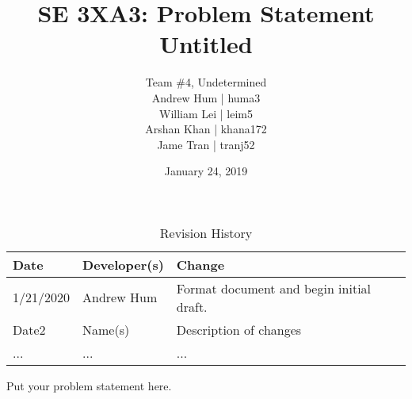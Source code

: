 \documentclass{article}
\title{SE 3XA3: Problem Statement\\Untitled}
\author{Team \#4, Undetermined
		\\ Andrew Hum | huma3
		\\ William Lei | leim5
		\\ Arshan Khan | khana172
		\\ Jame Tran | tranj52
}
\date{January 24, 2019}
\begin{document}
\begin{table}[hp]
\caption{Revision History} \label{TblRevisionHistory}
\begin{tabularx}{\textwidth}{llX}
\toprule
\textbf{Date} & \textbf{Developer(s)} & \textbf{Change}\\
\midrule
1/21/2020 & Andrew Hum & Format document and begin initial draft.\\
Date2 & Name(s) & Description of changes\\
... & ... & ...\\
\bottomrule
\end{tabularx}
\end{table}

\newpage

\maketitle

Put your problem statement here.





\end{document}
